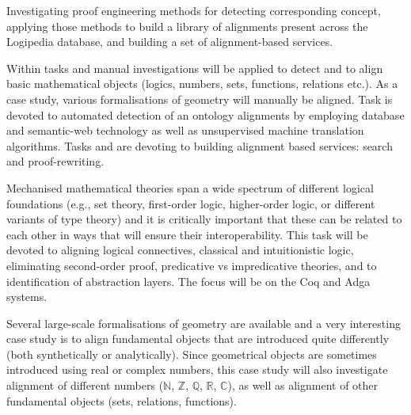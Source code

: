 \begin{workpackage}[id=alignment,type=RTD,wphases=1-48,
  short={Proof engineering},%
  title={Proof engineering},
  activity=jra,
  lead=Bel,
  LeeRM=12,  %
  StrRM=18,  %
  BelRM=18,  %
  ImtRM=6,  %
  InnRM=6,  %
  SacRM=6,  %
  FauRM=11, %
  BolRM=13, %
  InrRM=6   %
  ]

  \begin{wpobjectives}
    Investigating proof engineering
    methods for detecting corresponding concept, applying those methods
    to build a library of alignments present across the Logipedia
    database, and building a set of alignment-based services.
  \end{wpobjectives}

  \begin{wpdescription}
    Within tasks  and
     manual investigations will be
    applied to detect and to align basic mathematical objects (logics,
    numbers, sets, functions, relations etc.). As a case study,
    various formalisations of geometry will manually be aligned. Task
     is devoted to automated detection of
    an ontology alignments by employing database and semantic-web
    technology as well as unsupervised machine translation algorithms.
    Tasks  and 
    are devoting to building alignment based services: search and
    proof-rewriting.
  \end{wpdescription}

\begin{tasklist}
  \begin{task}[id=alignlogic,title=Logical foundations,shorttitle=Found.,lead=Lee,LeeRM=12,wphases=6-24!.67]
    Mechanised mathematical theories span a wide spectrum of different
    logical foundations (e.g., set theory, first-order logic,
    higher-order logic, or different variants of type theory) and it
    is critically important that these can be related to each other in
    ways that will ensure their interoperability. This task will be
    devoted to aligning logical connectives, classical and
    intuitionistic logic, eliminating second-order proof, predicative
    vs impredicative theories, and to identification of abstraction
    layers. The focus will be on the Coq and Adga systems.
  \end{task}
  
  \begin{task}[id=aligncasestudies,title=Case study: geometry,shorttitle=Cases,lead=Str,StrRM=18,BelRM=18,wphases=6-42!1]
    Several large-scale formalisations of geometry are available and a
    very interesting case study is to align fundamental objects that
    are introduced quite differently (both synthetically or
    analytically). Since geometrical objects are sometimes introduced
    using real or complex numbers, this case study will also
    investigate alignment of different numbers ($\mathbb{N}$,
    $\mathbb{Z}$, $\mathbb{Q}$, $\mathbb{R}$, $\mathbb{C}$), as well
    as alignment of other fundamental objects (sets, relations,
    functions).
  \end{task}


\end{tasklist}
\end{workpackage}
